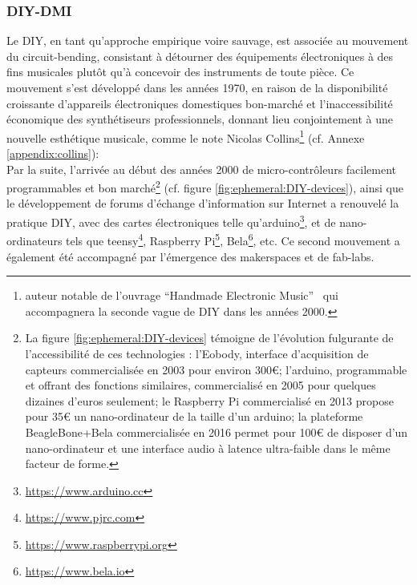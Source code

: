 \subsubsection{DIY-DMI}

\noindent Le \gls{DIY}, en tant qu'approche empirique voire sauvage, est associée au mouvement du \gls{circuit-bending}, consistant à détourner des équipements électroniques à des fins musicales plutôt qu'à concevoir des instruments de toute pièce. Ce mouvement s'est développé dans les années 1970, en raison de la disponibilité croissante d'appareils électroniques domestiques bon-marché et l'inaccessibilité économique des synthétiseurs professionnels, donnant lieu conjointement à une nouvelle esthétique musicale, comme le note Nicolas Collins\footnote{auteur notable de l'ouvrage ``Handmade Electronic Music''~\cite{collins_handmade_2006} qui accompagnera la seconde vague de \gls{DIY} dans les années 2000.} (cf. Annexe \ref{appendix:collins}): \\
\indent Par la suite, l'arrivée au début des années 2000 de micro-contrôleurs facilement programmables et bon marché\footnote{La figure \ref{fig:ephemeral:DIY-devices} témoigne de l'évolution fulgurante de l'accessibilité de ces technologies : l'Eobody, interface d'acquisition de capteurs commercialisée en 2003 pour environ 300€; l'arduino, programmable et offrant des fonctions similaires, commercialisé en 2005 pour quelques dizaines d'euros seulement; le Raspberry Pi commercialisé en 2013 propose pour 35€ un nano-ordinateur de la taille d'un arduino; la plateforme BeagleBone+Bela commercialisée en 2016 permet pour 100€ de disposer d'un nano-ordinateur et une interface audio à latence ultra-faible dans le même facteur de forme.} (cf. figure \ref{fig:ephemeral:DIY-devices}), ainsi que le développement de forums d'échange d'information sur Internet a renouvelé la pratique \gls{DIY}, avec des cartes électroniques telle qu'arduino\footnote{\url{https://www.arduino.cc}}, et de nano-ordinateurs tels que teensy\footnote{\url{https://www.pjrc.com}}, Raspberry Pi\footnote{\url{https://www.raspberrypi.org}}, Bela\footnote{\url{https://www.bela.io}}, etc. Ce second mouvement a également été accompagné par l'émergence des \glspl{makerspace} et de \glspl{fab-lab}.

